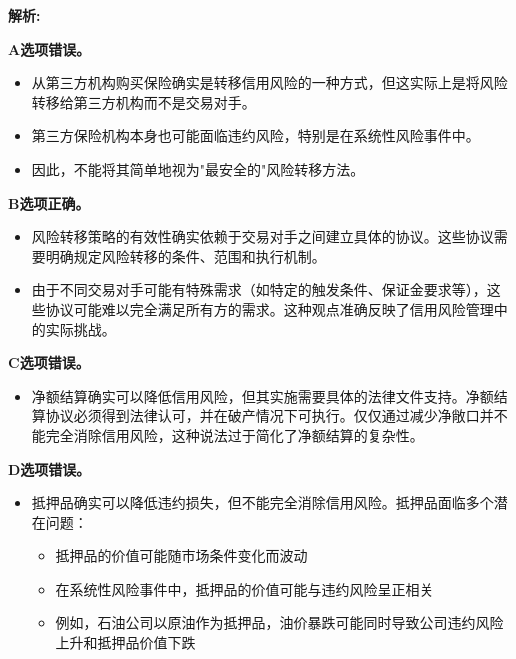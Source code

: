 \documentclass{article}
\newenvironment{explanation}
{\textbf{解析:}\par}
{\par}
\begin{document}
                \begin{explanation}
                    \textbf{A选项错误。}
                    \begin{itemize}
                        \item 从第三方机构购买保险确实是转移信用风险的一种方式，但这实际上是将风险转移给第三方机构而不是交易对手。
                        \item 第三方保险机构本身也可能面临违约风险，特别是在系统性风险事件中。
                        \item 因此，不能将其简单地视为"最安全的"风险转移方法。
                    \end{itemize}
                
                    \textbf{B选项正确。}
                    \begin{itemize}
                        \item 风险转移策略的有效性确实依赖于交易对手之间建立具体的协议。这些协议需要明确规定风险转移的条件、范围和执行机制。
                        \item 由于不同交易对手可能有特殊需求（如特定的触发条件、保证金要求等），这些协议可能难以完全满足所有方的需求。这种观点准确反映了信用风险管理中的实际挑战。
                    \end{itemize}
                
                    \textbf{C选项错误。}
                    \begin{itemize}
                        \item 净额结算确实可以降低信用风险，但其实施需要具体的法律文件支持。净额结算协议必须得到法律认可，并在破产情况下可执行。仅仅通过减少净敞口并不能完全消除信用风险，这种说法过于简化了净额结算的复杂性。
                    \end{itemize}
                
                    \textbf{D选项错误。}
                    \begin{itemize}
                        \item 抵押品确实可以降低违约损失，但不能完全消除信用风险。抵押品面临多个潜在问题：
                        \begin{itemize}
                            \item 抵押品的价值可能随市场条件变化而波动
                            \item 在系统性风险事件中，抵押品的价值可能与违约风险呈正相关
                            \item 例如，石油公司以原油作为抵押品，油价暴跌可能同时导致公司违约风险上升和抵押品价值下跌
                        \end{itemize}
                    \end{itemize}
                \end{explanation}
                
\end{document}

